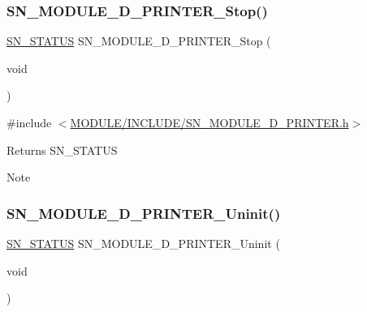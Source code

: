 \subsubsection{\texorpdfstring{S\+N\+\_\+\+M\+O\+D\+U\+L\+E\+\_\+D\+\_\+\+P\+R\+I\+N\+T\+E\+R\+\_\+\+Stop()}{SN\_MODULE\_3D\_PRINTER\_Stop()}}
{\footnotesize\ttfamily \hyperlink{group__SYSTEM__ERROR_ga4540713b9a7a18ce44d78c3a10f7442f}{S\+N\+\_\+\+S\+T\+A\+T\+US} S\+N\+\_\+\+M\+O\+D\+U\+L\+E\+\_\+D\+\_\+\+P\+R\+I\+N\+T\+E\+R\+\_\+\+Stop (\begin{DoxyParamCaption}\item[{void}]{ }\end{DoxyParamCaption})}



{\ttfamily \#include $<$\hyperlink{SN__MODULE__3D__PRINTER_8h}{M\+O\+D\+U\+L\+E/\+I\+N\+C\+L\+U\+D\+E/\+S\+N\+\_\+\+M\+O\+D\+U\+L\+E\+\_\+D\+\_\+\+P\+R\+I\+N\+T\+E\+R.\+h}$>$}

\begin{DoxyReturn}{Returns}
S\+N\+\_\+\+S\+T\+A\+T\+US
\end{DoxyReturn}
\begin{DoxyNote}{Note}

\end{DoxyNote}
\mbox{\label{group__MODULE__3D__PRINTER_ga776f5e31b0c0e176e35669f9432baec0}} 
\subsubsection{\texorpdfstring{S\+N\+\_\+\+M\+O\+D\+U\+L\+E\+\_\+D\+\_\+\+P\+R\+I\+N\+T\+E\+R\+\_\+\+Uninit()}{SN\_MODULE\_3D\_PRINTER\_Uninit()}}
{\footnotesize\ttfamily \hyperlink{group__SYSTEM__ERROR_ga4540713b9a7a18ce44d78c3a10f7442f}{S\+N\+\_\+\+S\+T\+A\+T\+US} S\+N\+\_\+\+M\+O\+D\+U\+L\+E\+\_\+D\+\_\+\+P\+R\+I\+N\+T\+E\+R\+\_\+\+Uninit (\begin{DoxyParamCaption}\item[{void}]{ }\end{DoxyParamCaption})}



